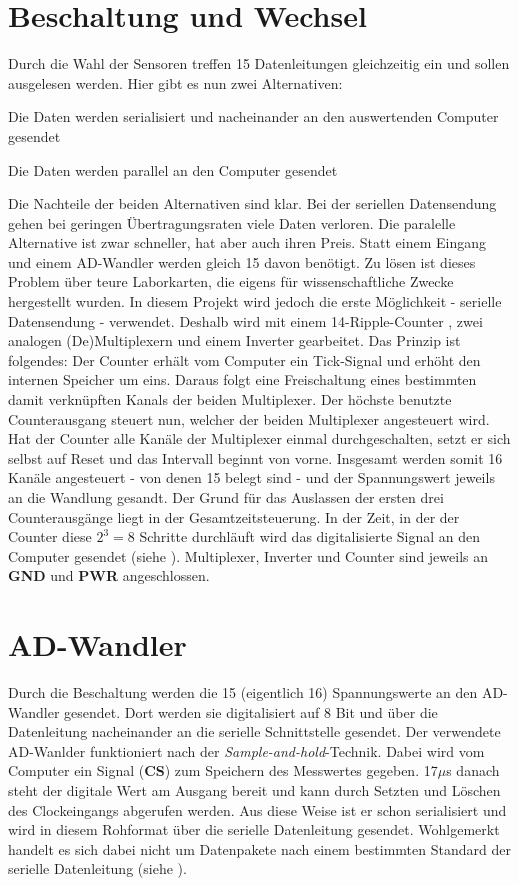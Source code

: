 \section{Beschaltung und Wechsel}
Durch die Wahl der Sensoren treffen 15 Datenleitungen gleichzeitig ein und sollen ausgelesen werden. Hier gibt es nun zwei Alternativen:
\begin{nListe}
\item Die Daten werden serialisiert und nacheinander an den auswertenden Computer gesendet
\item Die Daten werden parallel an den Computer gesendet
\end{nListe}
Die Nachteile der beiden Alternativen sind klar. Bei der seriellen Datensendung gehen bei geringen Übertragungsraten viele Daten verloren. Die paralelle Alternative ist zwar schneller, hat aber auch ihren Preis. Statt einem Eingang und einem AD-Wandler werden gleich 15 davon benötigt. Zu lösen ist dieses Problem über teure Laborkarten, die eigens für wissenschaftliche Zwecke hergestellt wurden. In diesem Projekt wird jedoch die erste Möglichkeit - serielle Datensendung - verwendet.
Deshalb wird mit einem 14-Ripple-Counter , zwei analogen (De)Multiplexern  und einem Inverter gearbeitet. Das Prinzip ist folgendes: Der Counter erhält vom Computer ein Tick-Signal und erhöht den internen Speicher um eins. Daraus folgt eine Freischaltung eines bestimmten damit verknüpften Kanals der beiden Multiplexer. Der höchste benutzte Counterausgang steuert nun, welcher der beiden Multiplexer angesteuert wird. Hat der Counter alle Kanäle der Multiplexer einmal durchgeschalten, setzt er sich selbst auf Reset und das Intervall beginnt von vorne. Insgesamt werden somit 16 Kanäle angesteuert - von denen 15 belegt sind - und der Spannungswert jeweils an die Wandlung gesandt. Der Grund für das Auslassen der ersten drei Counterausgänge liegt in der Gesamtzeitsteuerung. In der Zeit, in der der Counter diese $2^3 = 8$ Schritte durchläuft wird das digitalisierte Signal an den Computer gesendet (siehe ). 
Multiplexer, Inverter und Counter sind jeweils an \textbf{GND} und \textbf{PWR} angeschlossen.

\section{AD-Wandler}
Durch die Beschaltung werden die 15 (eigentlich 16) Spannungswerte an den AD-Wandler gesendet. Dort werden sie digitalisiert auf 8 Bit und über die Datenleitung nacheinander an die serielle Schnittstelle gesendet. Der verwendete AD-Wanlder  funktioniert nach der \textit{Sample-and-hold}-Technik. Dabei wird vom Computer ein Signal (\textbf{CS}) zum Speichern des Messwertes gegeben. 17$\mu$s danach steht der digitale Wert am Ausgang bereit und kann durch Setzten und Löschen des Clockeingangs abgerufen werden. Aus diese Weise ist er schon serialisiert und wird in diesem Rohformat über die serielle Datenleitung gesendet. Wohlgemerkt handelt es sich dabei nicht um Datenpakete nach einem bestimmten Standard der serielle Datenleitung (siehe ). 

